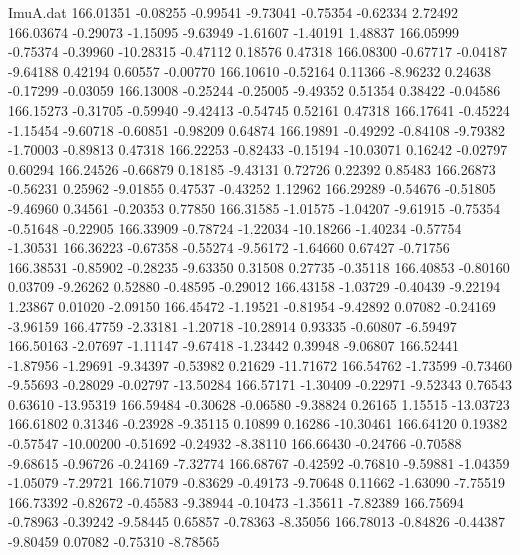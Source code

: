 \begin{filecontents}{ImuA.dat}
 166.01351   -0.08255   -0.99541   -9.73041   -0.75354   -0.62334    2.72492
 166.03674   -0.29073   -1.15095   -9.63949   -1.61607   -1.40191    1.48837
 166.05999   -0.75374   -0.39960  -10.28315   -0.47112    0.18576    0.47318
 166.08300   -0.67717   -0.04187   -9.64188    0.42194    0.60557   -0.00770
 166.10610   -0.52164    0.11366   -8.96232    0.24638   -0.17299   -0.03059
 166.13008   -0.25244   -0.25005   -9.49352    0.51354    0.38422   -0.04586
 166.15273   -0.31705   -0.59940   -9.42413   -0.54745    0.52161    0.47318
 166.17641   -0.45224   -1.15454   -9.60718   -0.60851   -0.98209    0.64874
 166.19891   -0.49292   -0.84108   -9.79382   -1.70003   -0.89813    0.47318
 166.22253   -0.82433   -0.15194  -10.03071    0.16242   -0.02797    0.60294
 166.24526   -0.66879    0.18185   -9.43131    0.72726    0.22392    0.85483
 166.26873   -0.56231    0.25962   -9.01855    0.47537   -0.43252    1.12962
 166.29289   -0.54676   -0.51805   -9.46960    0.34561   -0.20353    0.77850
 166.31585   -1.01575   -1.04207   -9.61915   -0.75354   -0.51648   -0.22905
 166.33909   -0.78724   -1.22034  -10.18266   -1.40234   -0.57754   -1.30531
 166.36223   -0.67358   -0.55274   -9.56172   -1.64660    0.67427   -0.71756
 166.38531   -0.85902   -0.28235   -9.63350    0.31508    0.27735   -0.35118
 166.40853   -0.80160    0.03709   -9.26262    0.52880   -0.48595   -0.29012
 166.43158   -1.03729   -0.40439   -9.22194    1.23867    0.01020   -2.09150
 166.45472   -1.19521   -0.81954   -9.42892    0.07082   -0.24169   -3.96159
 166.47759   -2.33181   -1.20718  -10.28914    0.93335   -0.60807   -6.59497
 166.50163   -2.07697   -1.11147   -9.67418   -1.23442    0.39948   -9.06807
 166.52441   -1.87956   -1.29691   -9.34397   -0.53982    0.21629  -11.71672
 166.54762   -1.73599   -0.73460   -9.55693   -0.28029   -0.02797  -13.50284
 166.57171   -1.30409   -0.22971   -9.52343    0.76543    0.63610  -13.95319
 166.59484   -0.30628   -0.06580   -9.38824    0.26165    1.15515  -13.03723
 166.61802    0.31346   -0.23928   -9.35115    0.10899    0.16286  -10.30461
 166.64120    0.19382   -0.57547  -10.00200   -0.51692   -0.24932   -8.38110
 166.66430   -0.24766   -0.70588   -9.68615   -0.96726   -0.24169   -7.32774
 166.68767   -0.42592   -0.76810   -9.59881   -1.04359   -1.05079   -7.29721
 166.71079   -0.83629   -0.49173   -9.70648    0.11662   -1.63090   -7.75519
 166.73392   -0.82672   -0.45583   -9.38944   -0.10473   -1.35611   -7.82389
 166.75694   -0.78963   -0.39242   -9.58445    0.65857   -0.78363   -8.35056
 166.78013   -0.84826   -0.44387   -9.80459    0.07082   -0.75310   -8.78565

\end{filecontents}
